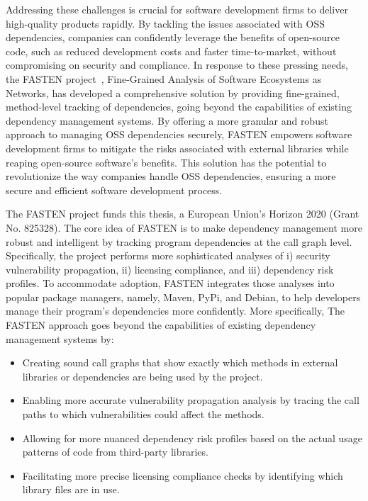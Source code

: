 Addressing these challenges is crucial for software development firms to deliver high-quality products rapidly. By tackling the issues associated with OSS dependencies, companies can confidently leverage the benefits of open-source code, such as reduced development costs and faster time-to-market, without compromising on security and compliance. In response to these pressing needs, the FASTEN project~\cite{fasten}, Fine-Grained Analysis of Software Ecosystems as Networks, has developed a comprehensive solution by providing fine-grained, method-level tracking of dependencies, going beyond the capabilities of existing dependency management systems. By offering a more granular and robust approach to managing OSS dependencies securely, FASTEN empowers software development firms to mitigate the risks associated with external libraries while reaping open-source software's benefits. This solution has the potential to revolutionize the way companies handle OSS dependencies, ensuring a more secure and efficient software development process.

The FASTEN project funds this thesis, a European
Union’s Horizon 2020 (Grant No. 825328). The core idea of FASTEN is to make dependency management more robust and intelligent by tracking program dependencies at the call graph level. Specifically, the project performs more sophisticated analyses of i) security vulnerability propagation, ii) licensing compliance, and iii) dependency risk profiles. To accommodate adoption, FASTEN integrates those analyses into popular package managers, namely, Maven, PyPi, and Debian, to help developers manage their program's dependencies more confidently. More specifically, The FASTEN approach goes beyond the capabilities of existing dependency management systems by:

\begin{itemize}
    \item Creating sound call graphs that show exactly which methods in external libraries or dependencies are being used by the project.
    \item Enabling more accurate vulnerability propagation analysis by tracing the call paths to which vulnerabilities could affect the methods.
    \item Allowing for more nuanced dependency risk profiles based on the actual usage patterns of code from third-party libraries.
    \item Facilitating more precise licensing compliance checks by identifying which library files are in use.
\end{itemize}

